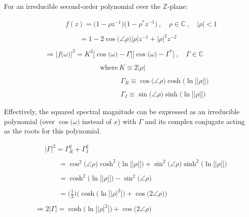 \documentclass{article}
\begin{document}
For an irreducible second-order polynomial over the $\mathbb{Z}$-plane:

\begin{align*}
    &\quad \quad \quad f(z) = \big(1 - \rho z^{-1}\big)\big(1 - \rho^{*}z^{-1}\big) \ , \quad \rho \in \mathbb{C} \ , \quad \big|\rho\big| < 1 \\ \\
    &\quad \quad \quad \quad \quad = 1 - 2\cos\big(\angle{\rho}\big)\big|\rho\big|z^{-1} + \big|\rho\big|^{2}z^{-2} \\ \\
    &\Rightarrow \Big|f\big(\omega\big)\Big|^{2} = K^{2}\Big[\cos\big(\omega\big) - \Gamma\Big]\Big[\cos\big(\omega\big) - \Gamma^{*}\Big] \ , \quad \Gamma \in \mathbb{C} \\ \\ 
    & \quad \quad \quad \quad \quad \quad \quad \quad \text{where} \ K \equiv 2\big|\rho\big| \\ \\
    & \quad \quad \quad \quad \quad \quad \quad \quad \quad \quad \quad \Gamma_{R} \equiv \cos\big(\angle{\rho}\big)\cosh\Big(\ln\big[\big|\rho\big|\big]\Big) \\ \\  
    & \quad \quad \quad \quad \quad \quad \quad \quad \quad \quad \quad \Gamma_{I} \equiv \sin\big(\angle{\rho}\big)\sinh\Big(\ln\big[\big|\rho\big|\big]\Big)
  \end{align*}\newline

Effectively, the squared spectral magnitude can be expressed as an irreducible polynomial (over $\cos\big(\omega\big)$ instead of $x$) with $\Gamma$ and its complex conjugate acting as the roots for this polynomial.

\begin{align*}
    &\quad \ \ \big|\Gamma\big|^{2} = \Gamma_{R}^{2} + \Gamma_{I}^{2} \\ \\
    &\quad \quad \quad \ \ = \cos^{2}\big(\angle{\rho}\big)\cosh^{2}\Big(\ln\big[\big|\rho\big|\big]\Big) + \sin^{2}\big(\angle{\rho}\big)\sinh^{2}\Big(\ln\big[\big|\rho\big|\big]\Big) \\ \\
    &\quad \quad \quad \ \ = \cosh^{2}\Big(\ln\big[\big|\rho\big|\big]\Big) - \sin^{2}\big(\angle{\rho}\big) \\ \\
    &\quad \quad \quad \ \ = \bigg(\frac{1}{2}\bigg)\Bigg(\cosh\Big(\ln\big[\big|\rho\big|^{2}\big]\Big) + \cos\big(2\angle{\rho}\big)\Bigg) \\ \\
    &\Rightarrow 2\big|\Gamma\big| = \cosh\Big(\ln\big[\big|\rho\big|^{2}\big]\Big) + \cos\big(2\angle{\rho}\big)
  \end{align*}\newline
\end{document}
